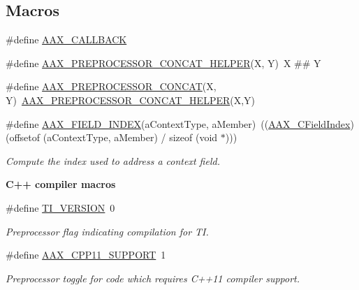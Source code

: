 \subsection*{Macros}
\begin{DoxyCompactItemize}
\item 
\#define \hyperlink{a00149_aaa22112139aa627574b1ef562f579d43}{A\+A\+X\+\_\+\+C\+A\+L\+L\+B\+A\+C\+K}
\item 
\#define \hyperlink{a00149_ab4f95cd2e83b3c871f47c24a4fbaae7a}{A\+A\+X\+\_\+\+P\+R\+E\+P\+R\+O\+C\+E\+S\+S\+O\+R\+\_\+\+C\+O\+N\+C\+A\+T\+\_\+\+H\+E\+L\+P\+E\+R}(X,  Y)~X \#\# Y
\item 
\#define \hyperlink{a00149_af135db633628741ce84c57c6ee8dd1ce}{A\+A\+X\+\_\+\+P\+R\+E\+P\+R\+O\+C\+E\+S\+S\+O\+R\+\_\+\+C\+O\+N\+C\+A\+T}(X,  Y)~\hyperlink{a00149_ab4f95cd2e83b3c871f47c24a4fbaae7a}{A\+A\+X\+\_\+\+P\+R\+E\+P\+R\+O\+C\+E\+S\+S\+O\+R\+\_\+\+C\+O\+N\+C\+A\+T\+\_\+\+H\+E\+L\+P\+E\+R}(X,Y)
\item 
\#define \hyperlink{a00149_acf807247ecd6e5899dc9dc31644e9a1d}{A\+A\+X\+\_\+\+F\+I\+E\+L\+D\+\_\+\+I\+N\+D\+E\+X}(a\+Context\+Type,  a\+Member)~((\hyperlink{a00149_ae807f8986143820cfb5d6da32165c9c7}{A\+A\+X\+\_\+\+C\+Field\+Index}) (offsetof (a\+Context\+Type, a\+Member) / sizeof (void $\ast$)))
\begin{DoxyCompactList}\small\item\em Compute the index used to address a context field. \end{DoxyCompactList}\end{DoxyCompactItemize}
\begin{Indent}{\bf C++ compiler macros}\par
\begin{DoxyCompactItemize}
\item 
\#define \hyperlink{a00149_a5f58f7770d463d262cc28b0e7b88747b}{T\+I\+\_\+\+V\+E\+R\+S\+I\+O\+N}~0
\begin{DoxyCompactList}\small\item\em Preprocessor flag indicating compilation for T\+I. \end{DoxyCompactList}\item 
\#define \hyperlink{a00149_a2da185ff8aad77278f985a6fe5ee07ba}{A\+A\+X\+\_\+\+C\+P\+P11\+\_\+\+S\+U\+P\+P\+O\+R\+T}~1
\begin{DoxyCompactList}\small\item\em Preprocessor toggle for code which requires C++11 compiler support. \end{DoxyCompactList}\end{DoxyCompactItemize}
\end{Indent}
